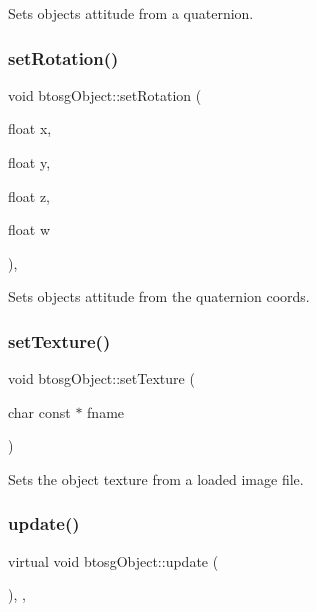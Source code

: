 Sets objects attitude from a quaternion. \mbox{\label{classbtosgObject_a4d21ca59b944fd26644db35d3e9ba67a}} 
\subsubsection{\texorpdfstring{set\+Rotation()}{setRotation()}\hspace{0.1cm}{\footnotesize\ttfamily [2/2]}}
{\footnotesize\ttfamily void btosg\+Object\+::set\+Rotation (\begin{DoxyParamCaption}\item[{float}]{x,  }\item[{float}]{y,  }\item[{float}]{z,  }\item[{float}]{w }\end{DoxyParamCaption})\hspace{0.3cm}{\ttfamily [inline]}, {\ttfamily [inherited]}}

Sets objects attitude from the quaternion coords. \mbox{\label{classbtosgObject_aff54acbc7c66811efb0cf2838107a241}} 
\subsubsection{\texorpdfstring{set\+Texture()}{setTexture()}}
{\footnotesize\ttfamily void btosg\+Object\+::set\+Texture (\begin{DoxyParamCaption}\item[{char const $\ast$}]{fname }\end{DoxyParamCaption})\hspace{0.3cm}{\ttfamily [inherited]}}

Sets the object texture from a loaded image file. \mbox{\label{classbtosgObject_a342917817dfde62554f83da8e0d5110b}} 
\subsubsection{\texorpdfstring{update()}{update()}}
{\footnotesize\ttfamily virtual void btosg\+Object\+::update (\begin{DoxyParamCaption}{ }\end{DoxyParamCaption})\hspace{0.3cm}{\ttfamily [inline]}, {\ttfamily [virtual]}, {\ttfamily [inherited]}}

